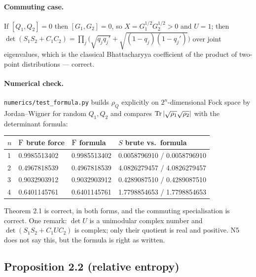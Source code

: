 \documentclass[11pt]{article}
\begin{document}
\paragraph{Commuting case.}
If $[Q_1,Q_2]=0$ then $[G_1,G_2]=0$, so $X=G_1^{1/2}G_2^{1/2}>0$ and $U=1$; then
$\det(S_1S_2+C_1C_2)=\prod_j\bigl(\sqrt{q_jq_j'}+\sqrt{(1-q_j)(1-q_j')}\bigr)$ over joint
eigenvalues, which is the classical Bhattacharyya coefficient of the product of two-point
distributions --- correct.

\paragraph{Numerical check.}
\texttt{numerics/test\_formula.py} builds $\rho_{Q}$ explicitly on $2^n$-dimensional Fock space by
Jordan--Wigner for random $Q_1,Q_2$ and compares $\operatorname{Tr}|\sqrt{\rho_1}\sqrt{\rho_2}|$ with the
determinant formula:
\begin{center}\small
\begin{tabular}{llll}\toprule
$n$ & $\operatorname{F}$ brute force & $\operatorname{F}$ formula & $S$ brute vs.\ formula\\\midrule
1 & 0.9985513402 & 0.9985513402 & 0.0058796910 / 0.0058796910\\
2 & 0.4967818539 & 0.4967818539 & 4.0826279457 / 4.0826279457\\
3 & 0.9032903912 & 0.9032903912 & 0.4289087510 / 0.4289087510\\
4 & 0.6401145761 & 0.6401145761 & 1.7798854653 / 1.7798854653\\\bottomrule
\end{tabular}\end{center}

\begin{verdictok}
Theorem 2.1 is correct, in both forms, and the commuting specialisation is correct.
One remark: $\det U$ is a unimodular complex number and $\det(S_1S_2+C_1UC_2)$ is complex; only
their quotient is real and positive.  N5 does not say this, but the formula is right as written.
\end{verdictok}

\subsection{Proposition 2.2 (relative entropy)}
\end{document}
